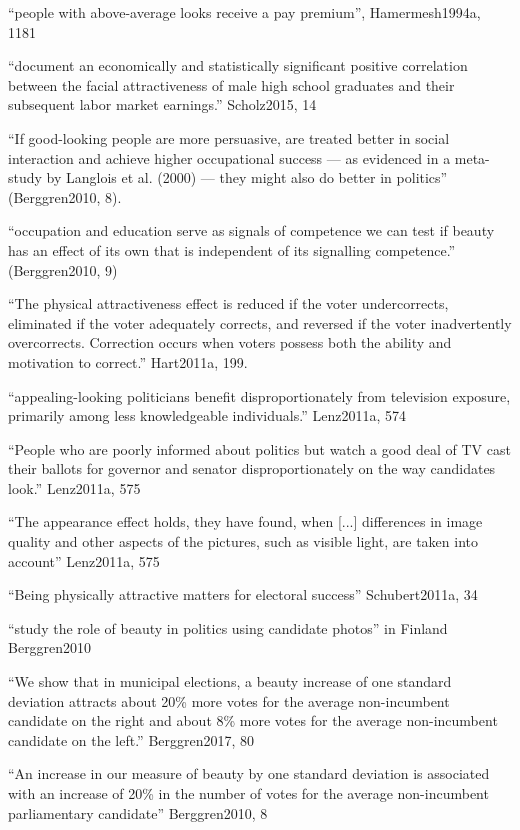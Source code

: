 ``people with above-average looks receive a pay premium'', Hamermesh1994a, 1181

``document an economically and statistically significant positive correlation between the facial attractiveness of male high school graduates and their subsequent labor market earnings.'' Scholz2015, 14

``If good-looking people are more persuasive, are treated better in social interaction and achieve higher occupational success — as evidenced in a meta-study by Langlois et al. (2000) — they might also do better in politics'' (Berggren2010, 8).

``occupation and education serve as signals of competence we can test if beauty has an effect of its own that is independent of its signalling competence.'' (Berggren2010, 9)

``The physical attractiveness effect is reduced if the voter undercorrects, eliminated if the voter adequately corrects, and reversed if the voter inadvertently overcorrects. Correction occurs when voters possess both the ability and motivation to correct.'' Hart2011a, 199.

``appealing-looking politicians benefit disproportionately from television exposure, primarily among less knowledgeable individuals.'' Lenz2011a, 574

``People who are poorly informed about politics but watch a good deal of TV cast their ballots for governor and senator disproportionately on the way candidates look.'' Lenz2011a, 575

``The appearance effect holds, they have found, when [...] differences in image quality and other aspects of the pictures, such as visible light, are taken into account'' Lenz2011a, 575

``Being physically attractive matters for electoral success'' Schubert2011a, 34


``study the role of beauty in politics using candidate photos'' in Finland Berggren2010

``We show that in municipal elections, a beauty increase of one standard deviation attracts about 20\% more votes for the average non-incumbent candidate on the right and about 8\% more votes for the average non-incumbent candidate on the left.'' Berggren2017, 80

``An increase in our measure of beauty by one standard deviation is associated with an increase of 20\% in the number of votes for the average non-incumbent parliamentary candidate'' Berggren2010, 8

